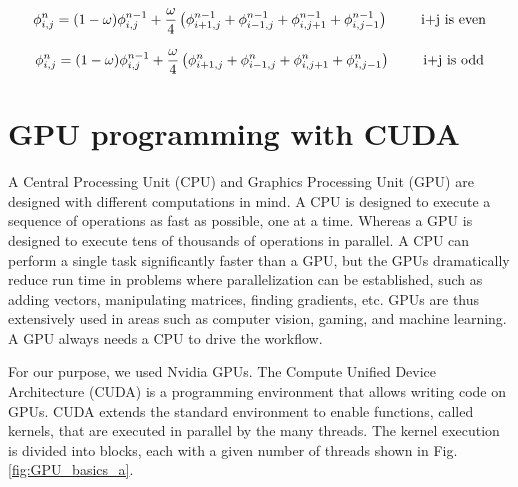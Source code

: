 \begin{equation}{\label{rb_e}}
 \phi_{i,j}^{n} = (1-\omega)\phi^{n-1}_{i,j} + \frac{\omega}{4} \left(\phi^{n-1}_{i+1,j} + \phi^{n-1}_{i-1,j} + \phi^{n-1}_{i,j+1} + \phi^{n-1}_{i,j-1} \right) \qquad \text{ i+j is even}
\end{equation}

\begin{equation}{\label{rb_o}}
 \phi_{i,j}^{n} = (1-\omega)\phi^{n-1}_{i,j} + \frac{\omega}{4} \left(\phi^{n}_{i+1,j} + \phi^n_{i-1,j} + \phi^{n}_{i,j+1} + \phi^n_{i,j-1} \right) \qquad \text{ i+j is odd}
\end{equation}

\section{GPU programming with CUDA {\cpp} }%

A Central Processing Unit (CPU) and Graphics Processing Unit (GPU) are designed with different computations in mind. A CPU is designed to execute a sequence of operations as fast as possible, one at a time. Whereas a GPU is designed to execute tens of thousands of operations in parallel. A CPU can perform a single task significantly faster than a GPU, but the GPUs dramatically reduce run time in problems where parallelization can be established, such as adding vectors, manipulating matrices, finding gradients, etc. GPUs are thus extensively used in areas such as computer vision, gaming, and machine learning. A GPU always needs a CPU to drive the workflow.

For our purpose, we used Nvidia GPUs. The Compute Unified Device Architecture (CUDA) is a programming environment that allows writing {\cpp} code on GPUs. CUDA extends the standard {\cpp} environment to enable functions, called kernels, that are executed in parallel by the many threads. The kernel execution is divided into blocks, each with a given number of threads shown in Fig. \ref{fig:GPU_basics_a}.

